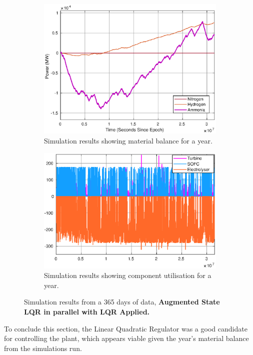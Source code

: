 


\begin{figure}
\centering
\begin{subfigure}{.5\textwidth}
  \centering
  \includegraphics[width=1\linewidth]{images/results/tankyear.eps}
  \caption{Simulation results showing material balance for a year.}
  \label{fig:tankyear}
\end{subfigure}%
\begin{subfigure}{.5\textwidth}
  \centering
  \includegraphics[width=1\linewidth]{images/results/useyear.eps}
  \caption{Simulation results showing component utilisation for a year.}
  \label{fig:useyear}
\end{subfigure}
\caption{Simulation results from a 365 days of data, {\bf Augmented State LQR in parallel with LQR Applied.}}
\label{fig:materialyear}
\end{figure}

To conclude this section, the Linear Quadratic Regulator was a good candidate for controlling the plant, which appears viable given the year's material balance from the simulations run.